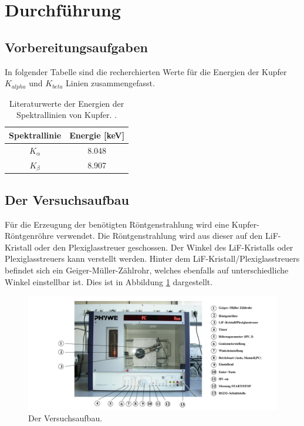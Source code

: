 \section{Durchführung}
\label{sec:Durchführung}
\subsection{Vorbereitungsaufgaben}
\label{sec:vorbereitung}
In folgender Tabelle sind die recherchierten Werte für die Energien der Kupfer $K_{alpha}$ und $K_{beta}$
Linien zusammengefasst.
\begin{table}[H]
    \centering
    \caption{Literaturwerte der Energien der Spektrallinien von Kupfer. \cite{AP03}.}
    \label{tab:Literaturwerte}
    \begin{tabular}{S S}
      \toprule
      {Spektrallinie} & {Energie [\si{\kilo\electronvolt}]} \\
      \midrule
    {$K_{\alpha}$} & 8.048 \\
    {$K_{\beta} $} & 8.907 \\
      \bottomrule
    \end{tabular}
  \end{table}
\noindent

\subsection{Der Versuchsaufbau}
Für die Erzeugung der benötigten Röntgenstrahlung wird eine Kupfer-Röntgenröhre verwendet. Die Röntgenstrahlung wird aus dieser auf den LiF-Kristall oder den Plexiglasstreuer geschossen. Der Winkel des
LiF-Kristalls oder Plexiglasstreuers kann verstellt werden. Hinter dem LiF-Kristall/Plexiglasstreuers befindet sich ein Geiger-Müller-Zählrohr, welches ebenfalls auf unterschiedliche Winkel einstellbar ist.
Dies ist in Abbildung \ref{fig:versuchsaufbau1} dargestellt.
\begin{figure}[H]
  \centering
  \includegraphics[scale=0.23]{content/versuchsaufbau1.png}
  \caption{Der Versuchsaufbau. \cite{AP01}}
  \label{fig:versuchsaufbau1}
\end{figure}

